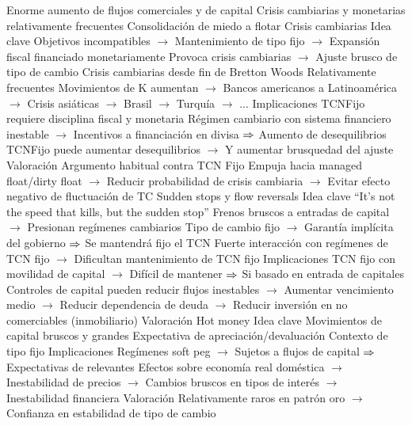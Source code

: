 \documentclass{nuevotema}
\begin{document}
\begin{esquemal}
				\4[] Enorme aumento de flujos comerciales y de capital
				\4[] Crisis cambiarias y monetarias relativamente frecuentes
				\4[] Consolidación de miedo a flotar
			\3 Crisis cambiarias
				\4 Idea clave
				\4[] Objetivos incompatibles
				\4[] $\to$ Mantenimiento de tipo fijo
				\4[] $\to$ Expansión fiscal financiado monetariamente
				\4[] Provoca crisis cambiarias
				\4[] $\to$ Ajuste brusco de tipo de cambio
				\4 Crisis cambiarias desde fin de Bretton Woods
				\4[] Relativamente frecuentes
				\4[] Movimientos de K aumentan
				\4[] $\to$ Bancos americanos a Latinoamérica
				\4[] $\to$ Crisis asiáticas
				\4[] $\to$ Brasil
				\4[] $\to$ Turquía
				\4[] $\to$ ...
				\4 Implicaciones
				\4[] TCNFijo requiere disciplina fiscal y monetaria
				\4[] Régimen cambiario con sistema financiero inestable
				\4[] $\to$ Incentivos a financiación en divisa
				\4[] $\Rightarrow$ Aumento de desequilibrios
				\4[] TCNFijo puede aumentar desequilibrios
				\4[] $\to$ Y aumentar brusquedad del ajuste
				\4 Valoración
				\4[] Argumento habitual contra TCN Fijo
				\4[] Empuja hacia managed float/dirty float
				\4[] $\to$ Reducir probabilidad de crisis cambiaria
				\4[] $\to$ Evitar efecto negativo de fluctuación de TC
			\3 Sudden stops y flow reversals
				\4 Idea clave
				\4[] ``It's not the speed that kills, but the sudden stop''
				\4[] Frenos bruscos a entradas de capital
				\4[] $\to$ Presionan regímenes cambiarios
				\4[] Tipo de cambio fijo
				\4[] $\to$ Garantía implícita del gobierno
				\4[] $\Rightarrow$ Se mantendrá fijo el TCN
				\4[] Fuerte interacción con regímenes de TCN fijo
				\4[] $\to$ Dificultan mantenimiento de TCN fijo
				\4 Implicaciones
				\4[] TCN fijo con movilidad de capital
				\4[] $\to$ Difícil de mantener
				\4[] $\Rightarrow$ Si basado en entrada de capitales
				\4[] Controles de capital pueden reducir flujos inestables
				\4[] $\to$ Aumentar vencimiento medio
				\4[] $\to$ Reducir dependencia de deuda
				\4[] $\to$ Reducir inversión en no comerciables (inmobiliario)
				\4 Valoración
			\3 Hot money
				\4 Idea clave
				\4[] Movimientos de capital bruscos y grandes
				\4[] Expectativa de apreciación/devaluación
				\4[] Contexto de tipo fijo
				\4 Implicaciones
				\4[] Regímenes soft peg
				\4[] $\to$ Sujetos a flujos de capital
				\4[] $\Rightarrow$ Expectativas de relevantes
				\4[] Efectos sobre economía real doméstica
				\4[] $\to$ Inestabilidad de precios
				\4[] $\to$ Cambios bruscos en tipos de interés
				\4[] $\to$ Inestabilidad financiera
				\4 Valoración
				\4[] Relativamente raros en patrón oro
				\4[] $\to$ Confianza en estabilidad de tipo de cambio

\end{esquemal}
\end{document}
